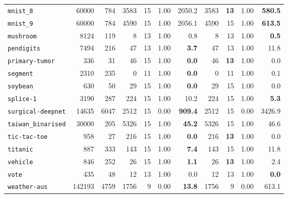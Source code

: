 \begin{tabular}{lccrrrrrrrr}
\texttt{mnist\_8} & \multicolumn{1}{r}{60000} & \multicolumn{1}{r}{784}  & 3583 & 15 & 1.00 & 2050.2 & 3583 & \textbf{13} & 1.00 & \textbf{580.5}\\
\texttt{mnist\_9} & \multicolumn{1}{r}{60000} & \multicolumn{1}{r}{784}  & 4590 & 15 & 1.00 & 2056.1 & 4590 & 15 & 1.00 & \textbf{613.5}\\
\texttt{mushroom} & \multicolumn{1}{r}{8124} & \multicolumn{1}{r}{119}  & 8 & 13 & 1.00 & 0.8 & 8 & 13 & 1.00 & \textbf{0.5}\\
\texttt{pendigits} & \multicolumn{1}{r}{7494} & \multicolumn{1}{r}{216}  & 47 & 13 & 1.00 & \textbf{3.7} & 47 & 13 & 1.00 & 11.8\\
\texttt{primary-tumor} & \multicolumn{1}{r}{336} & \multicolumn{1}{r}{31}  & 46 & 15 & 1.00 & \textbf{0.0} & 46 & \textbf{13} & 1.00 & 0.0\\
\texttt{segment} & \multicolumn{1}{r}{2310} & \multicolumn{1}{r}{235}  & 0 & 11 & 1.00 & \textbf{0.0} & 0 & 11 & 1.00 & 0.1\\
\texttt{soybean} & \multicolumn{1}{r}{630} & \multicolumn{1}{r}{50}  & 29 & 15 & 1.00 & \textbf{0.0} & 29 & 15 & 1.00 & 0.0\\
\texttt{splice-1} & \multicolumn{1}{r}{3190} & \multicolumn{1}{r}{287}  & 224 & 15 & 1.00 & 10.2 & 224 & 15 & 1.00 & \textbf{5.3}\\
\texttt{surgical-deepnet} & \multicolumn{1}{r}{14635} & \multicolumn{1}{r}{6047}  & 2512 & 15 & 0.00 & \textbf{909.4} & 2512 & 15 & 0.00 & 3426.9\\
\texttt{taiwan\_binarised} & \multicolumn{1}{r}{30000} & \multicolumn{1}{r}{205}  & 5326 & 15 & 1.00 & \textbf{45.2} & 5326 & 15 & 1.00 & 46.6\\
\texttt{tic-tac-toe} & \multicolumn{1}{r}{958} & \multicolumn{1}{r}{27}  & 216 & 15 & 1.00 & \textbf{0.0} & 216 & \textbf{13} & 1.00 & 0.0\\
\texttt{titanic} & \multicolumn{1}{r}{887} & \multicolumn{1}{r}{333}  & 143 & 15 & 1.00 & \textbf{7.4} & 143 & 15 & 1.00 & 11.8\\
\texttt{vehicle} & \multicolumn{1}{r}{846} & \multicolumn{1}{r}{252}  & 26 & 15 & 1.00 & \textbf{1.1} & 26 & \textbf{13} & 1.00 & 2.4\\
\texttt{vote} & \multicolumn{1}{r}{435} & \multicolumn{1}{r}{48}  & 12 & 13 & 1.00 & 0.0 & 12 & 13 & 1.00 & \textbf{0.0}\\
\texttt{weather-aus} & \multicolumn{1}{r}{142193} & \multicolumn{1}{r}{4759}  & 1756 & 9 & 0.00 & \textbf{13.8} & 1756 & 9 & 0.00 & 613.1\\

\end{tabular}
